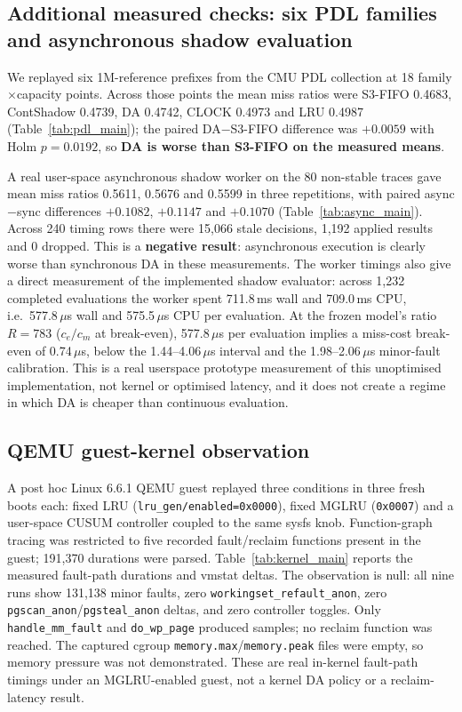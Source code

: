 \documentclass[10pt,twocolumn,a4paper]{IEEEtran}
\begin{document}
\subsection{Additional measured checks: six PDL families and asynchronous shadow evaluation}
\label{sec:additional}
We replayed six 1M-reference prefixes from the CMU PDL collection at 18 family$\times$capacity points. Across those points the mean miss ratios were S3-FIFO 0.4683, ContShadow 0.4739, DA 0.4742, CLOCK 0.4973 and LRU 0.4987 (Table~\ref{tab:pdl_main}); the paired DA$-$S3-FIFO difference was $+0.0059$ with Holm $p=0.0192$, so \textbf{DA is worse than S3-FIFO on the measured means}.

A real user-space asynchronous shadow worker on the 80 non-stable traces gave mean miss ratios 0.5611, 0.5676 and 0.5599 in three repetitions, with paired async$-$sync differences $+0.1082$, $+0.1147$ and $+0.1070$ (Table~\ref{tab:async_main}). Across 240 timing rows there were 15,066 stale decisions, 1,192 applied results and 0 dropped. This is a \textbf{negative result}: asynchronous execution is clearly worse than synchronous DA in these measurements. The worker timings also give a direct measurement of the implemented shadow evaluator: across 1{,}232 completed evaluations the worker spent 711.8\,ms wall and 709.0\,ms CPU, i.e.\ 577.8\,$\mu$s wall and 575.5\,$\mu$s CPU per evaluation. At the frozen model's ratio $R=783$ ($c_e/c_m$ at break-even), 577.8\,$\mu$s per evaluation implies a miss-cost break-even of 0.74\,$\mu$s, below the 1.44--4.06\,$\mu$s interval and the 1.98--2.06\,$\mu$s minor-fault calibration. This is a real userspace prototype measurement of this unoptimised implementation, not kernel or optimised latency, and it does not create a regime in which DA is cheaper than continuous evaluation.

\subsection{QEMU guest-kernel observation}
A post hoc Linux 6.6.1 QEMU guest replayed three conditions in three fresh boots each: fixed LRU (\texttt{lru\_gen/enabled=0x0000}), fixed MGLRU (\texttt{0x0007}) and a user-space CUSUM controller coupled to the same sysfs knob. Function-graph tracing was restricted to five recorded fault/reclaim functions present in the guest; 191,370 durations were parsed. Table~\ref{tab:kernel_main} reports the measured fault-path durations and vmstat deltas. The observation is null: all nine runs show 131,138 minor faults, zero \texttt{workingset\_refault\_anon}, zero \texttt{pgscan\_anon}/\texttt{pgsteal\_anon} deltas, and zero controller toggles. Only \texttt{handle\_mm\_fault} and \texttt{do\_wp\_page} produced samples; no reclaim function was reached. The captured cgroup \texttt{memory.max}/\texttt{memory.peak} files were empty, so memory pressure was not demonstrated. These are real in-kernel fault-path timings under an MGLRU-enabled guest, not a kernel DA policy or a reclaim-latency result.

\end{document}
